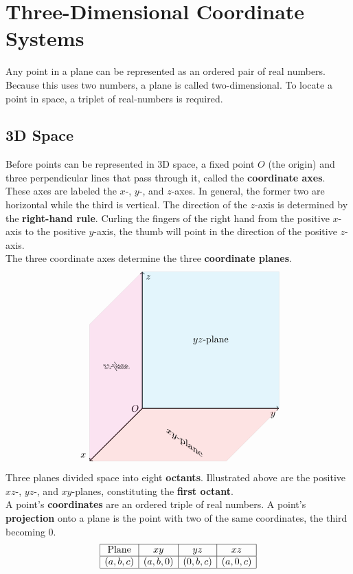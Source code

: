 \documentclass[../Calculus_\Roman{3}]{subfiles}
\begin{document}
	\section{Three-Dimensional Coordinate Systems}
		Any point in a plane can be represented as an ordered pair of real numbers. Because this uses two numbers, a plane is called two-dimensional. To locate a point in space, a triplet of real-numbers is required.
		\subsection*{3D Space}
			Before points can be represented in 3D space, a fixed point $O$ (the origin) and three perpendicular lines that pass through it, called the \textbf{coordinate axes}. These axes are labeled the $x$-, $y$-, and $z$-axes. In general, the former two are horizontal while the third is vertical. The direction of the $z$-axis is determined by the \textbf{right-hand rule}. Curling the fingers of the right hand from the positive $x$-axis to the positive $y$-axis, the thumb will point in the direction of the positive $z$-axis. \\
			The three coordinate axes determine the three \textbf{coordinate planes}.
			\[\begin{tikzpicture}[xscale = 5, yscale = 5]
				\coordinate (O) at (0, 0, 0) node[anchor = east]{$O$};
				\draw[thick, ->] (0, 0, 0) -- (1, 0, 0) node[anchor = north east]{$y$};
				\draw[thick, ->] (0, 0, 0) -- (0, 1, 0) node[anchor = north west]{$z$};
				\draw[thick, ->] (0, 0, 0) -- (0, 0, 1) node[anchor = south east]{$x$};
				\draw[fill = cyan, opacity = 0.1] (0, 0, 0) -- (1, 0, 0) -- (1, 1, 0) -- (0, 1, 0);
					\node at (0.5, 0.5, 0) {$yz$-plane};
				\draw[fill = magenta, opacity = 0.1] (0, 0, 0) -- (0, 1, 0) -- (0, 1, 1) -- (0, 0, 1);
					\node[xslant = -0.7, xscale = 0.7] at (0, 0.5, 0.5) {$xz$-plane};
				\draw[fill = red, opacity = 0.1] (0, 0, 0) -- (0, 0, 1) -- (1, 0, 1) -- (1, 0, 0);
					\node[below, yslant = -0.7] at (0.5, 0, 0.5) {$xy$-plane};
			\end{tikzpicture}\]
			Three planes divided space into eight \textbf{octants}. Illustrated above are the positive $xz$-, $yz$-, and $xy$-planes, constituting the \textbf{first octant}. \\
			A point's \textbf{coordinates} are an ordered triple of real numbers. A point's \textbf{projection} onto a plane is the point with two of the same coordinates, the third becoming 0.
			\[\begin{array}{|c|c|c|c|}\hline
				\text{Plane} & xy & yz & xz \\\hline
				(a, b, c) & (a, b, 0) & (0, b, c) & (a, 0, c) \\\hline
			\end{array}\]
\end{document}
